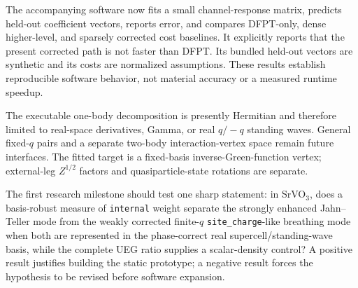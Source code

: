 The accompanying software now fits a small channel-response matrix, predicts
held-out coefficient vectors, reports error, and compares DFPT-only, dense
higher-level, and sparsely corrected cost baselines.  It explicitly reports that
the present corrected path is not faster than DFPT.  Its bundled held-out vectors
are synthetic and its costs are normalized assumptions.  These results establish
reproducible software behavior, not material accuracy or a measured runtime
speedup.

The executable one-body decomposition is presently Hermitian and therefore
limited to real-space derivatives, Gamma, or real $q/-q$ standing waves.  General
fixed-$q$ pairs and a separate two-body interaction-vertex space remain future
interfaces.  The fitted target is a fixed-basis inverse-Green-function vertex;
external-leg $Z^{1/2}$ factors and quasiparticle-state rotations are separate.

\begin{keypoint}
The first research milestone should test one sharp statement: in SrVO$_3$, does a
basis-robust measure of \texttt{internal} weight separate the strongly enhanced
Jahn--Teller mode from the weakly corrected finite-$q$
\texttt{site\_charge}-like breathing mode when both are represented in the
phase-correct real supercell/standing-wave basis, while the complete UEG ratio supplies
a scalar-density control?  A positive result justifies
building the static prototype; a negative result forces the hypothesis to be
revised before software expansion.
\end{keypoint}
